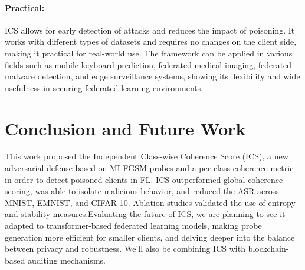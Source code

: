 \documentclass[conference]{IEEEtran}
\begin{document}
\paragraph{Practical:}
ICS allows for early detection of attacks and reduces the impact of poisoning. It works with different types of datasets and requires no changes on the client side, making it practical for real-world use. The framework can be applied in various fields such as mobile keyboard prediction, federated medical imaging, federated malware detection, and edge surveillance systems, showing its flexibility and wide usefulness in securing federated learning environments.
\section{Conclusion and Future Work}
\label{sec:conclusion}

This work proposed the Independent Class-wise Coherence Score (ICS), a new adversarial defense based on MI-FGSM probes and a per-class coherence metric in order to detect poisoned clients in FL. ICS outperformed global coherence scoring, was able to isolate malicious behavior, and reduced the ASR across MNIST, EMNIST, and CIFAR-10. Ablation studies validated the use of entropy and stability measures.Evaluating the future of ICS, we are planning to see it adapted to transformer-based federated learning models, making probe generation more efficient for smaller clients, and delving deeper into the balance between privacy and robustness. We'll also be combining ICS with blockchain-based auditing mechanisms.




\end{document}
